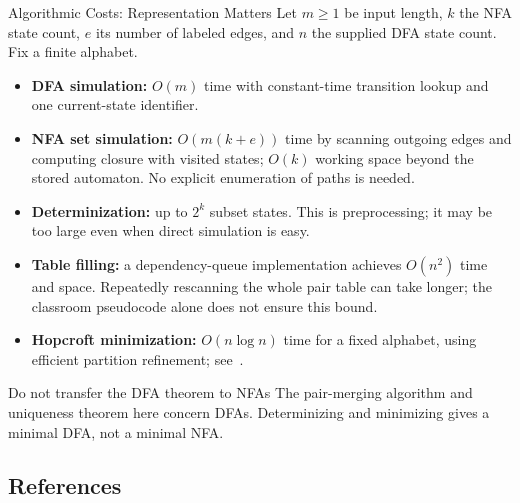 \documentclass[10pt]{beamer}
\begin{document}
\begin{frame}{Algorithmic Costs: Representation Matters}
  \small
  Let $m\ge1$ be input length, $k$ the NFA state count, $e$ its number of
  labeled edges, and $n$ the supplied DFA state count. Fix a finite alphabet.
  \begin{itemize}
    \item \textbf{DFA simulation:} $O(m)$ time with constant-time transition
      lookup and one current-state identifier.
    \item \textbf{NFA set simulation:} $O(m(k+e))$ time by scanning outgoing
      edges and computing closure with visited states; $O(k)$ working space
      beyond the stored automaton. No explicit enumeration of paths is needed.
    \pause
    \item \textbf{Determinization:} up to $2^k$ subset states. This is
      preprocessing; it may be too large even when direct simulation is easy.
    \item \textbf{Table filling:} a dependency-queue implementation achieves
      $O(n^2)$ time and space. Repeatedly rescanning the whole pair table can
      take longer; the classroom pseudocode alone does not ensure this bound.
    \item \textbf{Hopcroft minimization:} $O(n\log n)$ time for a fixed
      alphabet, using efficient partition refinement; see~\cite{hopcroft}.
  \end{itemize}
  \begin{alertblock}{Do not transfer the DFA theorem to NFAs}
    The pair-merging algorithm and uniqueness theorem here concern DFAs.
    Determinizing and minimizing gives a minimal DFA, not a minimal NFA.
  \end{alertblock}
\end{frame}

\subsection{References}
\end{document}
